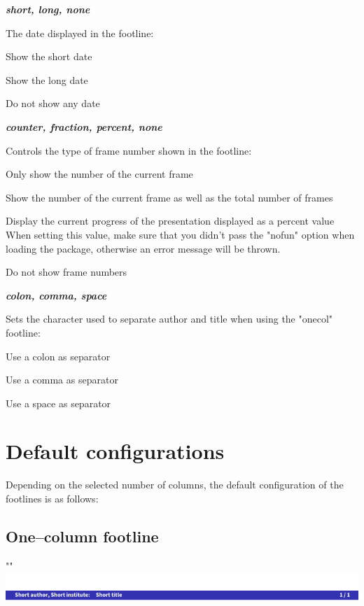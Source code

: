 \documentclass[11pt]{ltxdoc}
\newcommand{\DescribeOption}[3]{
  \DescribeMacro{#1}
  \begin{minipage}[t]{\textwidth}
    \textit{\textbf{#2}}\dotfill~\par
    \begingroup
    \vspace{0.5em}#3\par
    \endgroup
  \end{minipage}%
  \bigskip\medskip%
}
\begin{document}
	\DescribeOption{date}{short, long, none}{%
		The date displayed in the footline:
		\begin{description}\itemsep0pt
			\item[short]
				Show the short date
			\item[long]
				Show the long date
			\item[none]
				Do not show any date
		\end{description}}
	
	\DescribeOption{framenrs}{counter, fraction, percent, none}{%
		Controls the type of frame number shown in the footline:
		\begin{description}\itemsep0pt
			\item[counter]
				Only show the number of the current frame
			\item[fraction]
				Show the number of the current frame as well as the total number of frames
			\item[percent]
				Display the current progress of the presentation displayed as a percent value \\
				When setting this value, make sure that you didn't pass the "nofun" option when loading the package, otherwise an error message will be thrown.
			\item[none]
				Do not show frame numbers
		\end{description}}
	
	\DescribeOption{atsep}{colon, comma, space}{%
		Sets the character used to separate author and title when using the "onecol" footline:
		\begin{description}\itemsep0pt
			\item[colon]
				Use a colon as separator
			\item[comma]
				Use a comma as separator
			\item[space]
				Use a space as separator
		\end{description}}
	
	
	
	\section{Default configurations} \label{defaultconfig}%
	Depending on the selected number of columns, the default configuration of the footlines is as follows:
	
	\subsection*{One--column footline}
	"" \\[\smallskipamount]
	\includegraphics[page=1,width=\textwidth, trim=0 0 0 15, clip]{hackthefootline-examples}
	
\end{document}
